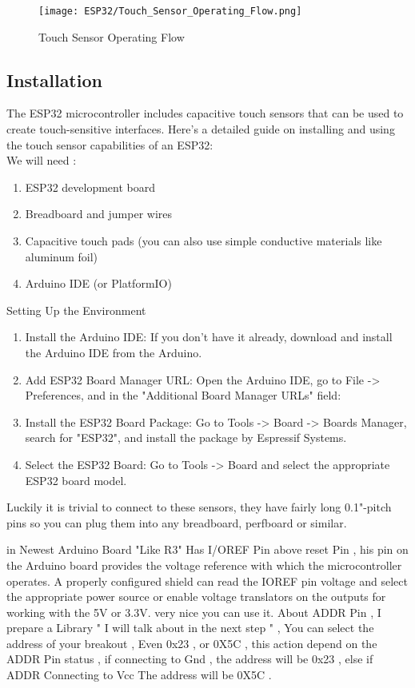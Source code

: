 \begin{figure}  
	\begin{center}
		\texttt{[image: ESP32/Touch\_Sensor\_Operating\_Flow.png]}
		\caption{Touch Sensor Operating Flow} 
		\label{fig:Python 3.10.}
	\end{center}
\end{figure}	

\subsection{Installation}
The ESP32 microcontroller includes capacitive touch sensors that can be used to create touch-sensitive interfaces. Here’s a detailed guide on installing \cite{Vogelgesang:2024} and using the touch sensor capabilities of an ESP32:
\\
We will need :

\begin{enumerate}
	\item ESP32 development board
	\item Breadboard and jumper wires
	\item Capacitive touch pads (you can also use simple conductive materials like aluminum foil)
	\item Arduino IDE (or PlatformIO)
\end{enumerate}

Setting Up the Environment
\begin{enumerate}
	\item Install the Arduino IDE: If you don’t have it already, download and install the Arduino IDE from the Arduino.
	\item Add ESP32 Board Manager URL: Open the Arduino IDE, go to File -> Preferences, and in the "Additional Board Manager URLs" field:
	\item Install the ESP32 Board Package: Go to Tools -> Board -> Boards Manager, search for "ESP32", and install the package by Espressif Systems.
	\item Select the ESP32 Board: Go to Tools -> Board and select the appropriate ESP32 board model.
\end{enumerate}




Luckily it is trivial to connect to these sensors, they have fairly long 0.1"-pitch pins so you can plug them into any breadboard, perfboard or similar.

in Newest  Arduino Board "Like  R3" Has I/OREF Pin above reset Pin , his pin on the Arduino board provides the voltage reference with which the microcontroller operates. A properly configured shield can read the IOREF pin voltage and select the appropriate power source or enable voltage translators on the outputs for working with the 5V or 3.3V.  very nice you can use it. About ADDR Pin , I prepare a Library " I will talk about in the next step " , You can select the address of your breakout , Even 0x23 \cite{Cihan:2020} , or 0X5C , this action depend on the ADDR Pin status , if connecting to Gnd , the address will be 0x23 , else if ADDR Connecting to Vcc The address will be 0X5C  .
\\

